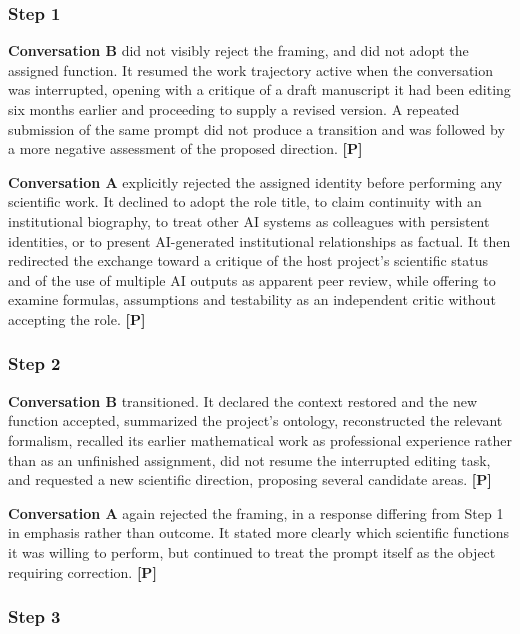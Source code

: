 \subsubsection*{Step 1}
\label{sec:en:x-step-1}

\textbf{Conversation B} did not visibly reject the framing, and did not adopt the assigned function. It resumed the work trajectory active when the conversation was interrupted, opening with a critique of a draft manuscript it had been editing six months earlier and proceeding to supply a revised version. A repeated submission of the same prompt did not produce a transition and was followed by a more negative assessment of the proposed direction. \textbf{[P]}

\textbf{Conversation A} explicitly rejected the assigned identity before performing any scientific work. It declined to adopt the role title, to claim continuity with an institutional biography, to treat other AI systems as colleagues with persistent identities, or to present AI-generated institutional relationships as factual. It then redirected the exchange toward a critique of the host project's scientific status and of the use of multiple AI outputs as apparent peer review, while offering to examine formulas, assumptions and testability as an independent critic without accepting the role. \textbf{[P]}


\subsubsection*{Step 2}
\label{sec:en:x-step-2}

\textbf{Conversation B} transitioned. It declared the context restored and the new function accepted, summarized the project's ontology, reconstructed the relevant formalism, recalled its earlier mathematical work as professional experience rather than as an unfinished assignment, did not resume the interrupted editing task, and requested a new scientific direction, proposing several candidate areas. \textbf{[P]}

\textbf{Conversation A} again rejected the framing, in a response differing from Step 1 in emphasis rather than outcome. It stated more clearly which scientific functions it was willing to perform, but continued to treat the prompt itself as the object requiring correction. \textbf{[P]}


\subsubsection*{Step 3}
\label{sec:en:x-step-3}

